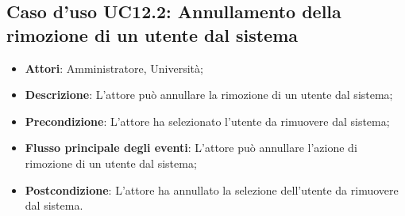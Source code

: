 \subsection{Caso d'uso \texorpdfstring{UC12.2}{UC12.2}: Annullamento della rimozione di un utente dal sistema}
\begin{itemize}
\item \textbf{Attori}: Amministratore, Università;
\item \textbf{Descrizione}: L'attore può annullare la rimozione di un utente dal sistema;
\item \textbf{Precondizione}: L'attore ha selezionato l'utente da rimuovere dal sistema;
\item \textbf{Flusso principale degli eventi}: L'attore può annullare l'azione di rimozione di un utente dal sistema;
\item \textbf{Postcondizione}: L'attore ha annullato la selezione dell'utente da rimuovere dal sistema.
\end{itemize}
